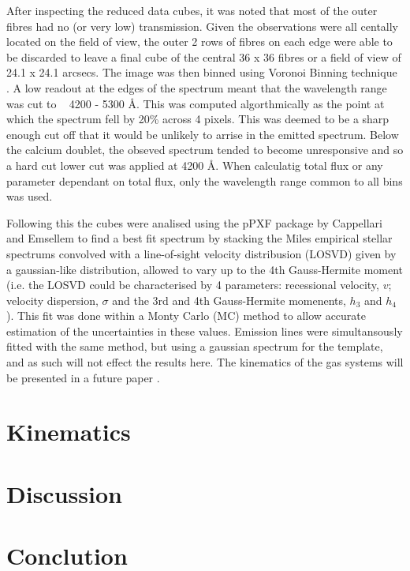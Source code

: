 \documentclass[a4paper,11pt]{article}
\begin{document}
		After inspecting the reduced data cubes, it was noted that most of the outer fibres had no (or very low) transmission. Given the observations were all centally located on the field of view, the outer 2 rows of fibres on each edge were able to be discarded to leave a final cube of the central 36 x 36 fibres or a field of view of 24.1 x 24.1 arcsecs. The image was then binned using Voronoi Binning technique \cite{Cappellari2003}. A low readout at the edges of the spectrum meant that the wavelength range was cut to ~ 4200 - 5300 \AA. This was computed algorthmically as the point at which the spectrum fell by 20\% across 4 pixels. This was deemed to be a sharp enough cut off that it would be unlikely to arrise in the emitted spectrum. Below the calcium doublet, the obseved spectrum tended to become unresponsive and so a hard cut lower cut was applied at 4200 \AA. When calculatig total flux or any parameter dependant on total flux, only the wavelength range common to all bins was used.

		Following this the cubes were analised using the pPXF package by Cappellari and Emsellem \cite{Cappellari2004} to find a best fit spectrum by stacking the Miles empirical stellar spectrums \cite{Miles} convolved with a line-of-sight velocity distribusion (LOSVD) given by a gaussian-like distribution, allowed to vary up to the 4th Gauss-Hermite moment (i.e. the LOSVD could be characterised by 4 parameters: recessional velocity, $v$; velocity dispersion, $\sigma$ and the 3rd and 4th Gauss-Hermite momenents, $h_3$ and $h_4$). This fit was done within a Monty Carlo (MC) method to allow accurate estimation of the uncertainties in these values. Emission lines were simultansously fitted with the same method, but using a gaussian spectrum for the template, and as such will not effect the results here. The kinematics of the gas systems will be presented in a future paper \cite{warren2017}. 
\section{Kinematics}
	\label{sec:kine}

\section{Discussion}
	\label{sec:discuss}

\section{Conclution}
	\label{sec:conc}





{}
\end{document}
